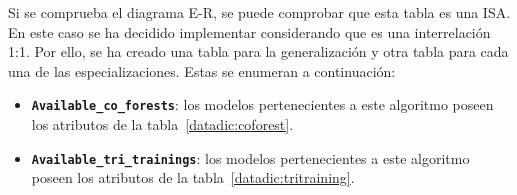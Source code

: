 Si se comprueba el diagrama E-R, se puede comprobar que esta tabla es una ISA. En este caso se ha decidido implementar considerando que es una interrelación 1:1. Por ello, se ha creado una tabla para la generalización y otra tabla para cada una de las especializaciones. Estas se enumeran a continuación:

\begin{itemize}
	\item \textbf{\texttt{Available\_co\_forests}}: los modelos pertenecientes a este algoritmo poseen los atributos de la tabla~\ref{datadic:coforest}.

	\begin{table}
		\caption[Diccionario de datos: \texttt{Available\_co\_forests}]{Diccionario de datos: tabla correspondiente a la clase \texttt{Available\_co\_forests}.}
		\label{datadic:coforest}
	\end{table}

	\item \textbf{\texttt{Available\_tri\_trainings}}: los modelos pertenecientes a este algoritmo poseen los atributos de la tabla~\ref{datadic:tritraining}.


\end{itemize}
